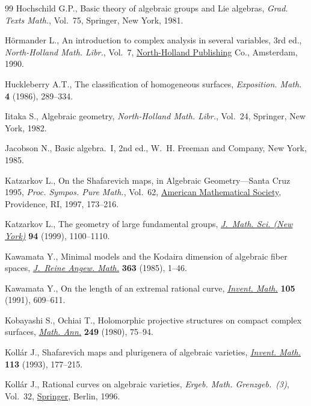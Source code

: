 \documentclass[11pt]{article}
\numberwithin{equation}{section}
\numberwithin{equation}{section}
\begin{document}
\begin{thebibliography}{99}
Hochschild G.P., Basic theory of algebraic groups and {L}ie algebras,
 \textit{Grad. Texts Math.}, Vol.~75, Springer, New York, 1981.

H\"ormander L., An introduction to complex analysis in several variables, 3rd ed.,
 \textit{North-Holland Math. Libr.}, Vol.~7, \href{https://doi.org/10.1007/978-3-031-26428-3}{North-Holland Publishing}
 Co., Amsterdam, 1990.

Huckleberry A.T., The classification of homogeneous surfaces,
 \textit{Exposition. Math.} \textbf{4} (1986), 289--334.

Iitaka S., Algebraic geometry, \textit{North-Holland Math. Libr.}, Vol.~24,
 Springer, New York, 1982.

Jacobson N., Basic algebra.~{I}, 2nd ed., W.~H. Freeman and Company, New York,
 1985.

Katzarkov L., On the {S}hafarevich maps, in Algebraic {G}eometry---{S}anta
 {C}ruz 1995, \textit{Proc. Sympos. Pure Math.}, Vol.~62, \href{https://doi.org/10.1090/pspum/062.2/1492537}{American
 Mathematical Society}, Providence, RI, 1997, 173--216.

Katzarkov L., The geometry of large fundamental groups, \href{https://doi.org/10.1007/BF02367250}{\textit{J.~Math. Sci. (New York)}} \textbf{94} (1999), 1100--1110.

Kawamata Y., Minimal models and the {K}odaira dimension of algebraic fiber
 spaces, \href{https://doi.org/10.1515/crll.1985.363.1}{\textit{J.~Reine Angew. Math.}} \textbf{363} (1985), 1--46.

Kawamata Y., On the length of an extremal rational curve, \href{https://doi.org/10.1007/BF01232281}{\textit{Invent.
 Math.}} \textbf{105} (1991), 609--611.

Kobayashi S., Ochiai T., Holomorphic projective structures on compact complex
 surfaces, \href{https://doi.org/10.1007/BF01387081}{\textit{Math. Ann.}} \textbf{249} (1980), 75--94.

Koll\'ar J., Shafarevich maps and plurigenera of algebraic varieties,
 \href{https://doi.org/10.1007/BF01244307}{\textit{Invent. Math.}} \textbf{113} (1993), 177--215.

Koll\'ar J., Rational curves on algebraic varieties, \textit{Ergeb. Math.
 Grenzgeb.~(3)}, Vol.~32, \href{https://doi.org/10.1007/978-3-662-03276-3}{Springer}, Berlin, 1996.


\end{thebibliography}
\end{document}
